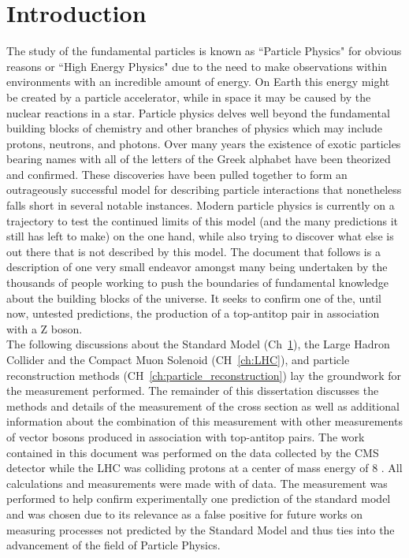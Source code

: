 \chapter{Introduction}
\label{ch:intro}     
The study of the fundamental particles is known as ``Particle Physics" for obvious reasons or ``High Energy Physics" due to the need to make observations within environments with an incredible amount of energy. On Earth this energy might be created by a particle accelerator, while in space it may be caused by the nuclear reactions in a star. Particle physics delves well beyond the fundamental building blocks of chemistry and other branches of physics which may include protons, neutrons, and photons. Over many years the existence of exotic particles bearing names with all of the letters of the Greek alphabet have been theorized and confirmed. These discoveries have been pulled together to form an outrageously successful model for describing particle interactions that nonetheless falls short in several notable instances. Modern particle physics is currently on a trajectory to test the continued limits of this model (and the many predictions it still has left to make) on the one hand, while also trying to discover what else is out there that is not described by this model. The document that follows is a description of one very small endeavor amongst many being undertaken by the thousands of people working to push the boundaries of fundamental knowledge about the building blocks of the universe. It seeks to confirm one of the, until now, untested predictions, the production of a top-antitop pair in association with a Z boson.	\\

The following discussions about the Standard Model (Ch~\ref{ch:intro}), the Large Hadron Collider and the Compact Muon Solenoid (CH~\ref{ch:LHC}), and particle reconstruction methods (CH~\ref{ch:particle_reconstruction}) lay the groundwork for the measurement performed. The remainder of this dissertation discusses the methods and details of the measurement of the \ttZ cross section as well as additional information about the combination of this measurement with other measurements of vector bosons produced in association with top-antitop pairs. The work contained in this document was performed on the data collected by the CMS detector while the LHC was colliding protons at a center of mass energy of 8 \TeV. All calculations and measurements were made with \intLumi of data. The measurement was performed to help confirm experimentally one prediction of the standard model and was chosen due to its relevance as a false positive for future works on measuring processes not predicted by the Standard Model and thus ties into the advancement of the field of Particle Physics.
	
